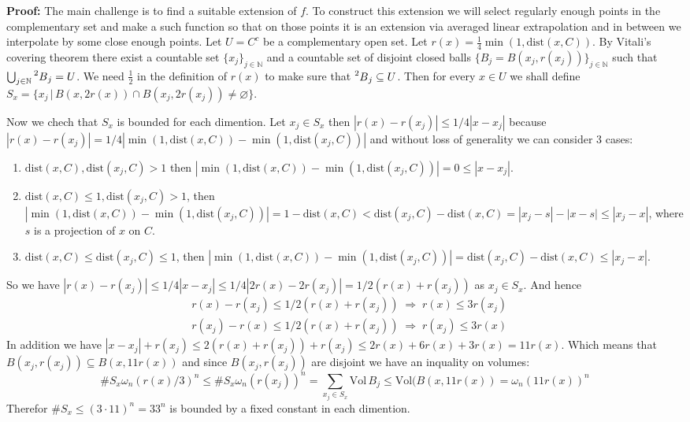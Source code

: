 \documentclass{article}
\begin{document}
\vspace{1ex}
\textbf{Proof:}
The main challenge is to find a suitable extension of $f$. To construct this
extension we will select regularly enough points in the complementary set and
make a such function so that on those points it is an extension via averaged linear extrapolation and in
between we interpolate by some close enough points. Let $U=C^c$ be a complementary
open set. Let $r(x)=\frac{1}{4}\min(1,\text{dist}(x,C))$.
By Vitali's covering theorem there exist a countable set
$\{x_j\}_{j\in\mathbb{N}}$ and a countable set of disjoint closed balls $\{B_j=B(x_j, r(x_j))\}_
{j\in\mathbb{N}}$ such that $\bigcup_{j\in\mathbb{N}}\prescript{2}{}B_j=U$. We
need $\frac{1}{2}$ in the definition of $r(x)$ to make sure that $\prescript{2}{}
B_j\subseteq U$. Then for every $x\in U$ we shall define $S_x=\{x_j\,|\,B(x,2r(x))
\cap B(x_j,2r(x_j))\neq\varnothing\}$. 

\vspace{1ex}
Now we chech that $S_x$ is bounded for each dimention.
Let $x_j\in S_x$ then $|r(x)-r(x_j)| \leq 1/4|x-x_j|$ because $|r(x)-r(x_j)|=
1/4|\min(1,\text{dist}(x,C))-\min(1,\text{dist}(x_j,C))|$ and without loss of
generality we can consider 3 cases:
\begin{enumerate}
    \item $\text{dist}(x,C),\text{dist}(x_j,C)>1$ then $|\min(1,\text{dist}(x,C))
        -\min(1,\text{dist}(x_j,C))|=0\leq|x-x_j|$.
    \item $\text{dist}(x,C)\leq1,\text{dist}(x_j,C)>1$, then $|\min(1,\text{dist}
        (x,C))-\min(1,\text{dist}(x_j,C))| = 1-\text{dist}(x,C)<\text{dist}(x_j,C)
        -\text{dist}(x,C)=|x_j-s|-|x-s|\leq|x_j-x|$, where $s$ is a projection
        of $x$ on $C$. 
    \item $\text{dist}(x,C)\leq\text{dist}(x_j,C)\leq1$, then $|\min(1,\text{dist}
        (x,C))-\min(1,\text{dist}(x_j,C))| = \text{dist}(x_j,C)-\text{dist}(x,C)
        \leq|x_j-x|$.
\end{enumerate}

So we have $|r(x)-r(x_j)| \leq 1/4|x-x_j|\leq1/4|2r(x)-2r(x_j)|=1/2(r(x)+r(x_j))$
as $x_j\in S_x$. And hence
\[
\begin{aligned}
    &r(x)-r(x_j)\leq1/2(r(x)+r(x_j))\;\Rightarrow\;r(x)\leq 3r(x_j)\\
    &r(x_j)-r(x)\leq1/2(r(x)+r(x_j))\;\Rightarrow\;r(x_j)\leq 3r(x)
\end{aligned}
\]
In addition we have $|x-x_j|+r(x_j)\leq2(r(x)+r(x_j))+r(x_j)\leq2r(x)+6r(x)+3r(x)=
11r(x)$. Which means that $B(x_j, r(x_j))\subseteq B(x, 11r(x))$ and since
$B(x_j, r(x_j))$ are disjoint we have an inquality on volumes:
\[
    \#S_x\omega_n(r(x)/3)^n\leq\#S_x\omega_n(r(x_j))^n=\sum_{x_j\in S_x}\text{Vol}
    \,B_j\leq\text{Vol}(B(x,11r(x))=\omega_n(11r(x))^n
\]
Therefor $\#S_x\leq(3\cdot11)^n=33^n$ is bounded by a fixed constant in each
dimention.
\end{document}

